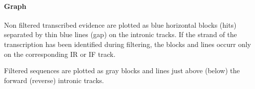 \paragraph{Graph}

Non filtered transcribed evidence are plotted as blue horizontal
blocks (hits) separated by thin blue lines (gap) on the intronic
tracks. If the strand of the transcription has been identified during
filtering, the blocks and lines occurr only on the corresponding IR or
IF track.

Filtered sequences are plotted as gray blocks and lines just above
(below) the forward (reverse) intronic tracks.

